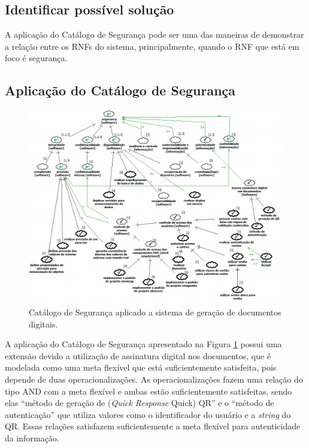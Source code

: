 \subsection{Identificar possível solução}

A aplicação do Catálogo de Segurança pode ser uma das maneiras de demonstrar a relação entre os RNFs do sistema, principalmente, quando o RNF que está em foco é segurança.

\pagebreak

\subsection{Aplicação do Catálogo de Segurança}

\begin{figure}[h!]
	\centering
	\includegraphics[keepaspectratio=true,scale=0.7]{figuras/catalogoPersona4.PNG}
	\caption{Catálogo de Segurança aplicado a sistema de geração de documentos digitais.}
	\label{catalogoPersona4}
\end{figure}

A aplicação do Catálogo de Segurança apresentado na Figura \ref{catalogoPersona4} possui uma extensão devido a utilização de assinatura digital nos documentos, que é modelada como uma meta flexível que está suficientemente satisfeita, pois depende de duas operacionalizações. As operacionalizações fazem uma relação do tipo AND com a meta flexível e ambas estão suficientemente satisfeitas, sendo elas “método de geração de (\textit{Quick Response} Quick) QR” e o  “método de autenticação” que utiliza valores como o identificador do usuário e a \textit{string} do QR. Essas relações satisfazem suficientemente a meta flexível para autenticidade da informação. 


